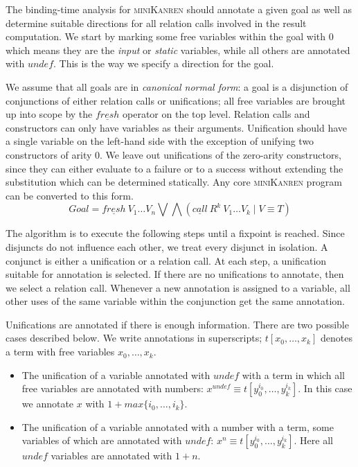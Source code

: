 \documentclass[submission,copyright,creativecommons]{eptcs}
\newcommand{\miniKanren}{\textsc{miniKanren}}
\newcommand\undef{unde\!f}
\newcommand\fresh{f\!resh}
\begin{document}
The binding-time analysis for \miniKanren{} should annotate a given goal as well as determine suitable directions for all relation calls involved in the result computation.
We start by marking some free variables within the goal with $0$ which means they are the \emph{input} or \emph{static} variables, while all others are annotated with $\undef{}$.
This is the way we specify a direction for the goal.

We assume that all goals are in \emph{canonical normal form}: a goal is a disjunction of conjunctions of either relation calls or unifications; all free variables are brought up into scope by the $\underline{\fresh{}}$ operator on the top level. Relation calls and constructors can only have variables as their arguments. Unification should have a single variable on the left-hand side with the exception of unifying two constructors of arity $0$.
We leave out unifications of the zero-arity constructors, since they can either evaluate to a failure or to a success without extending the substitution which can be determined statically.
Any core \miniKanren{} program can be converted to this form.
$$Goal = \underline{\fresh{}} \ V_1 \dots V_n \bigvee \bigwedge (\underline{call} \ R^k \ V_1 \dots V_k \mid V \equiv T)$$

The algorithm is to execute the following steps until a fixpoint is reached.
Since disjuncts do not influence each other, we treat every disjunct in isolation.
A conjunct is either a unification or a relation call.
At each step, a unification suitable for annotation is selected.
If there are no unifications to annotate, then we select a relation call.
Whenever a new annotation is assigned to a variable, all other uses of the same variable within the conjunction get the same annotation.

Unifications are annotated if there is enough information.
There are two possible cases described below.
We write annotations in superscripts; $t[x_0, \dots, x_k]$ denotes a term with free variables $x_0, \dots, x_k$.
\begin{itemize}
  \item The unification of a variable annotated with $\undef{}$ with a term in which all free variables are annotated with numbers: $x^{\undef{}} \equiv t[y_0^{i_0},\dots, y_k^{i_k}]$. In this case we annotate $x$ with $1+max\{i_0,\dots,i_k\}$.
  \item The unification of a variable annotated with a number with a term, some variables of which are annotated with $\undef{}$: $x^{n} \equiv t[y_0^{i_0},\dots, y_k^{i_k}]$. Here all $\undef{}$ variables are annotated with $1+n$.
\end{itemize}
\end{document}
